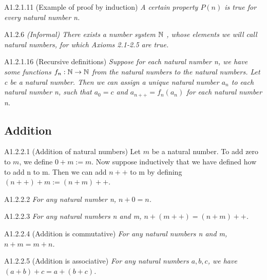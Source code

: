 \begin{proposition}{A1.2.1.11}
    (Example of proof by induction) \emph{A certain property $P(n)$ is true for every natural number n.}
\end{proposition}

\begin{assumption}{A1.2.6}
    \emph{(Informal) There exists a number system $\mathbb{N}$ , whose elements we will call natural numbers, for which Axioms 2.1-2.5 are true.}
\end{assumption}

\begin{proposition}{A1.2.1.16}
    (Recursive definitions) \emph{Suppose for each natural number n, we have some functions $f_{n}: \mathbb{N} \rightarrow \mathbb{N}$ from the natural numbers to the natural numbers. Let c be a natural number. Then we can assign a unique natural number $a_{n}$ to each natural number n, such that $a_{0} = c$ and $a_{n++} = f_{n}(a_{n})$ for each natural number n.}
\end{proposition}

\subsection{Addition}
\begin{definition}{A1.2.2.1}
    (Addition of natural numbers) Let $m$ be a natural number. To add zero to $m$, we define $0+m:=m$. Now suppose inductively that we have defined how to add n to m. Then we can add $n++$ to m by defining $(n++)+m := (n+m)++$.
\end{definition}

\begin{lemma}{A1.2.2.2}
    \emph{For any natural number n, $n+0=n$.}
\end{lemma}

\begin{lemma}{A1.2.2.3}
    \emph{For any natural numbers n and m, $n+(m++)=(n+m)++$.}
\end{lemma}

\begin{proposition}{A1.2.2.4}
    (Addition is commutative) \emph{For any natural numbers n and m, $n+m=m+n$.}
\end{proposition}

\begin{proposition}{A1.2.2.5}
    (Addition is associative) \emph{For any natural numbers $a, b, c$, we have $(a+b)+c=a+(b+c)$.}
\end{proposition}

